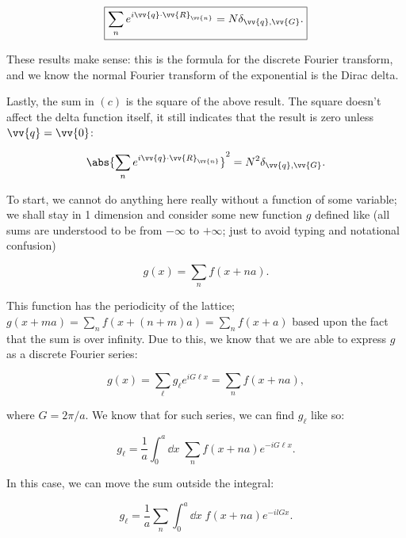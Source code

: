 \begin{parts}
  \begin{equation}
    \boxed{\sum_n e^{i\vv{q}\cdot\vv{R}_{\vv{n}}} = N\delta_{\vv{q},\vv{G}}.}
  \end{equation}

  These results make sense: this is the formula for the discrete Fourier transform, and we know the normal Fourier transform of the exponential is the Dirac delta.

  Lastly, the sum in $(c)$ is the square of the above result. The square doesn't affect the delta function itself, it still indicates that the result is zero unless $\vv{q} = \vv{0}$:

  \begin{equation}
    \abs{\sum_n e^{i\vv{q}\cdot\vv{R}_{\vv{n}}}}^2 = N^2\delta_{\vv{q},\vv{G}}.
  \end{equation}




\item To start, we cannot do anything here really without a function of some variable; we shall stay in 1 dimension and consider some new function $g$ defined like (all sums are understood to be from $-\infty$ to $+\infty$; just to avoid typing and notational confusion)

  \begin{equation}
    g(x) = \sum_n f(x+na).
  \end{equation}

  This function has the periodicity of the lattice; $g(x + ma) = \sum_n f(x + (n+m)a) = \sum_n f(x+a)$ based upon the fact that the sum is over infinity. Due to this, we know that we are able to express $g$ as a discrete Fourier series:

  \begin{equation}
    g(x) = \sum_\ell g_\ell e^{iG\ell x} = \sum_n f(x + na),
  \end{equation}

  where $G = 2\pi/a$. We know that for such series, we can find $g_\ell$ like so:

  \begin{equation}
    g_\ell = \frac{1}{a}\int_0^a \dd x \; \sum_n f(x+na) e^{-iG\ell x}.
  \end{equation}

  In this case, we can move the sum outside the integral:

  \begin{equation}
    g_\ell = \frac{1}{a}\sum_n \int_0^a \dd x \; f(x+na)e^{-ilGx}.
  \end{equation}


\end{parts}
